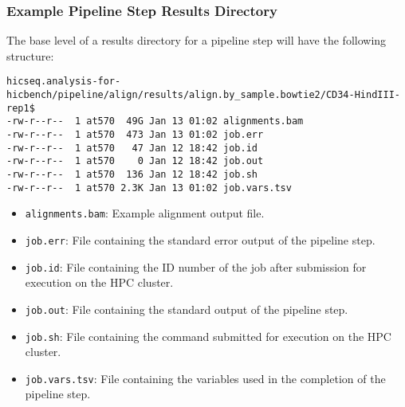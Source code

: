 \subsubsection{Example Pipeline Step Results Directory}
The base level of a results directory for a pipeline step will have the following structure:

\begin{lstlisting}
hicseq.analysis-for-hicbench/pipeline/align/results/align.by_sample.bowtie2/CD34-HindIII-rep1$
-rw-r--r--  1 at570  49G Jan 13 01:02 alignments.bam
-rw-r--r--  1 at570  473 Jan 13 01:02 job.err
-rw-r--r--  1 at570   47 Jan 12 18:42 job.id
-rw-r--r--  1 at570    0 Jan 12 18:42 job.out
-rw-r--r--  1 at570  136 Jan 12 18:42 job.sh
-rw-r--r--  1 at570 2.3K Jan 13 01:02 job.vars.tsv
\end{lstlisting}

\begin{itemize}
\item \texttt{alignments.bam}: Example alignment output file.
\item \texttt{job.err}: File containing the standard error output of the pipeline step. 
\item \texttt{job.id}: File containing the ID number of the job after submission for execution on the HPC cluster.
\item \texttt{job.out}: File containing the standard output of the pipeline step. 
\item \texttt{job.sh}: File containing the command submitted for execution on the HPC cluster.
\item \texttt{job.vars.tsv}: File containing the variables used in the completion of the pipeline step.
\end{itemize}

\clearpage